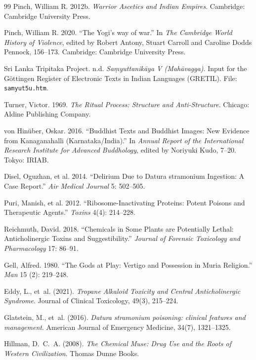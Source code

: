 \documentclass[11pt,twoside,letterpaper]{article}
\begin{document}
\begin{thebibliography}{99}
Pinch, William R. 2012b. \textit{Warrior Ascetics and Indian Empires}. Cambridge: Cambridge University Press.

Pinch, William R. 2020. ``The Yogi’s way of war.'' In \textit{The Cambridge World History of Violence}, edited by Robert Antony, Stuart Carroll and Caroline Dodds Pennock, 156–173. Cambridge: Cambridge University Press.

{Sri Lanka Tripitaka Project}. n.d. \textit{Saṃyuttanikāya V (Mahāvagga)}.
Input for the Göttingen Register of Electronic Texts in Indian Languages (GRETIL).
File: \texttt{samyut5u.htm}.

Turner, Victor. 1969. \textit{The Ritual Process: Structure and Anti-Structure}.
Chicago: Aldine Publishing Company.

von Hinüber, Oskar. 2016. ``Buddhist Texts and Buddhist Images: New Evidence
from Kanaganahalli (Karnataka/India).'' In \textit{Annual Report of the
International Research Institute for Advanced Buddhology}, edited by Noriyuki Kudo,
7–20. Tokyo: IRIAB.

Disel, Oguzhan, et al. 2014. ``Delirium Due to Datura stramonium Ingestion: 
A Case Report.'' \textit{Air Medical Journal} 5: 502--505.

Puri, Manish, et al. 2012. ``Ribosome-Inactivating Proteins: Potent Poisons 
and Therapeutic Agents.'' \textit{Toxins} 4(4): 214--228. 

Reichmuth, David. 2018. ``Chemicals in Some Plants are Potentially Lethal: 
Anticholinergic Toxins and Suggestibility.'' \textit{Journal of Forensic 
Toxicology and Pharmacology} 17: 86--91.

Gell, Alfred. 1980. ``The Gods at Play: Vertigo and Possession in Muria Religion.'' 
\textit{Man} 15 (2): 219–248.

Eddy, L., et~al. (2021).
\newblock \textit{Tropane Alkaloid Toxicity and Central Anticholinergic Syndrome}.
\newblock Journal of Clinical Toxicology, 49(3), 215--224.

Glatstein, M., et~al. (2016).
\newblock \textit{Datura stramonium poisoning: clinical features and management}.
\newblock American Journal of Emergency Medicine, 34(7), 1321--1325.

Hillman, D.~C.~A. (2008).
\newblock \textit{The Chemical Muse: Drug Use and the Roots of Western Civilization}.
\newblock Thomas Dunne Books.


\end{thebibliography}
\end{document}
